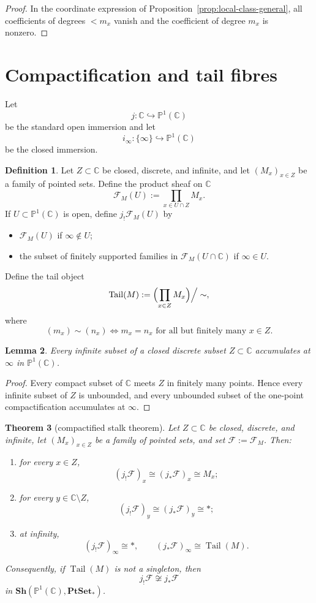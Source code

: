 \documentclass[11pt,a4paper]{article}
\newtheorem{theorem}{Theorem}[section]
\newtheorem{lemma}[theorem]{Lemma}
\theoremstyle{definition}
\newtheorem{definition}[theorem]{Definition}
\theoremstyle{remark}
\DeclareMathOperator{\Tail}{Tail}
\newcommand{\CC}{\mathbb C}
\newcommand{\PP}{\mathbb P}
\newcommand{\PtSet}{\mathbf{PtSet}_*}
\newcommand{\cF}{\mathcal F}
\newcommand{\into}{\hookrightarrow}
\begin{document}
\begin{proof}
In the coordinate expression of Proposition~\ref{prop:local-class-general}, all coefficients of degrees $<m_x$ vanish and the coefficient of degree $m_x$ is nonzero.
\end{proof}

\section{Compactification and tail fibres}

Let
\[
j:\CC\into \PP^1(\CC)
\]
be the standard open immersion and let
\[
i_\infty:\{\infty\}\into\PP^1(\CC)
\]
be the closed immersion.

\begin{definition}
Let $Z\subset\CC$ be closed, discrete, and infinite, and let $(M_x)_{x\in Z}$ be a family of pointed sets. Define the product sheaf on $\CC$
\[
\cF_M(U):=\prod_{x\in U\cap Z} M_x.
\]
If $U\subset\PP^1(\CC)$ is open, define $j_!\cF_M(U)$ by
\begin{itemize}[leftmargin=2em]
\item $\cF_M(U)$ if $\infty\notin U$;
\item the subset of finitely supported families in $\cF_M(U\cap\CC)$ if $\infty\in U$.
\end{itemize}
Define the tail object
\[
\Tail(M):=\Bigl(\prod_{x\in Z} M_x\Bigr)\Big/\sim,
\]
where
\[
(m_x)\sim(n_x)\iff m_x=n_x\text{ for all but finitely many }x\in Z.
\]
\end{definition}

\begin{lemma}\label{lem:infty-accumulation}
Every infinite subset of a closed discrete subset $Z\subset \CC$ accumulates at $\infty$ in $\PP^1(\CC)$.
\end{lemma}

\begin{proof}
Every compact subset of $\CC$ meets $Z$ in finitely many points. Hence every infinite subset of $Z$ is unbounded, and every unbounded subset of the one-point compactification accumulates at $\infty$.
\end{proof}

\begin{theorem}[compactified stalk theorem]\label{thm:compactified-stalks}
Let $Z\subset\CC$ be closed, discrete, and infinite, let $(M_x)_{x\in Z}$ be a family of pointed sets, and set $\cF:=\cF_M$. Then:
\begin{enumerate}[label=(\roman*)]
\item for every $x\in Z$,
\[
(j_!\cF)_x\cong (j_*\cF)_x\cong M_x;
\]
\item for every $y\in\CC\setminus Z$,
\[
(j_!\cF)_y\cong (j_*\cF)_y\cong *;
\]
\item at infinity,
\[
(j_!\cF)_\infty\cong *,
\qquad
(j_*\cF)_\infty\cong \Tail(M).
\]
\end{enumerate}
Consequently, if $\Tail(M)$ is not a singleton, then
\[
j_!\cF\not\cong j_*\cF
\]
in $\mathbf{Sh}(\PP^1(\CC),\PtSet)$.
\end{theorem}
\end{document}
